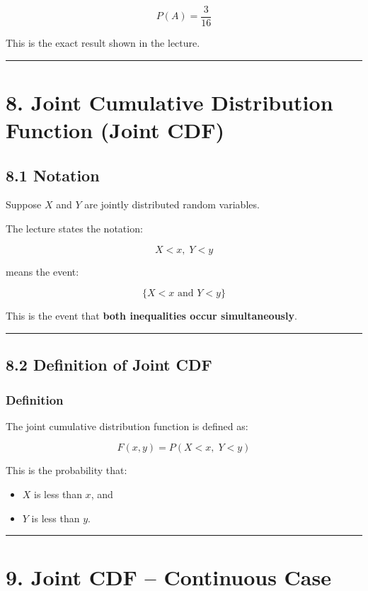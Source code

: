 \documentclass[12pt]{article}
\begin{document}
\[
P(A)=\frac{3}{16}
\]

This is the exact result shown in the lecture.

\hrule
\vspace{1em}

\section*{8. Joint Cumulative Distribution Function (Joint CDF)}

\subsection*{8.1 Notation}

Suppose \(X\) and \(Y\) are jointly distributed random variables.

The lecture states the notation:

\[
X<x,\;Y<y
\]

means the event:

\[
\{X<x \text{ and } Y<y\}
\]

This is the event that \textbf{both inequalities occur simultaneously}.

\hrule
\vspace{1em}

\subsection*{8.2 Definition of Joint CDF}

\subsubsection*{Definition}

The joint cumulative distribution function is defined as:

\[
F(x,y)=P(X<x,\;Y<y)
\]

This is the probability that:

\begin{itemize}
    \item \(X\) is less than \(x\), and
    \item \(Y\) is less than \(y\).
\end{itemize}

\hrule
\vspace{1em}

\section*{9. Joint CDF – Continuous Case}
\end{document}
